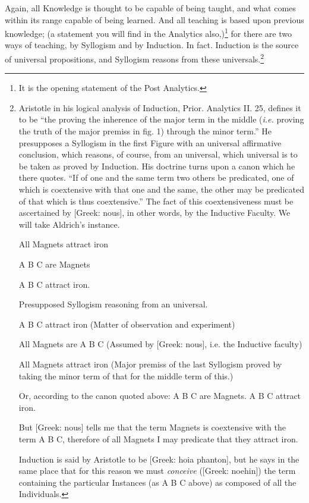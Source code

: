 Again, all Knowledge is thought to be capable of being taught, and what comes
within its range capable of being learned. And all teaching is based upon
previous knowledge; (a statement you will find in the Analytics also,)\footnote{It is the opening statement of the Post Analytics.}
for there are two ways of teaching, by Syllogism and by Induction. In fact.
Induction is the source of universal propositions, and Syllogism reasons from
these universals.\footnote{Aristotle in his logical analysis of Induction, Prior. Analytics II. 25,
defines it to be “the proving the inherence of the major term in the
middle (\emph{i.e.} proving the truth of the major premiss in fig. 1) through
the minor term.” He presupposes a Syllogism in the first Figure with an
universal affirmative conclusion, which reasons, of course, from an universal,
which universal is to be taken as proved by Induction. His doctrine turns upon
a canon which he there quotes. “If of one and the same term two others be
predicated, one of which is coextensive with that one and the same, the other
may be predicated of that which is thus coextensive.” The fact of this
coextensiveness must be ascertained by [Greek: nous], in other words, by the
Inductive Faculty. We will take Aldrich’s instance.

All Magnets attract iron

A B C are Magnets

A B C attract iron.

Presupposed Syllogism reasoning from an universal.

A B C attract iron (Matter of observation and experiment)

All Magnets are A B C (Assumed by [Greek: nous], i.e. the Inductive faculty)

All Magnets attract iron (Major premiss of the last Syllogism proved by taking
the minor term of that for the middle term of this.)

Or, according to the canon quoted above: A B C are Magnets. A B C attract iron.

But [Greek: nous] tells me that the term Magnets is coextensive with the term A
B C, therefore of all Magnets I may predicate that they attract iron.

Induction is said by Aristotle to be [Greek: hoia phanton], but he says in the
same place that for this reason we must \emph{conceive} ([Greek: noehin]) the
term containing the particular Instances (as A B C above) as composed of all
the Individuals.

}
